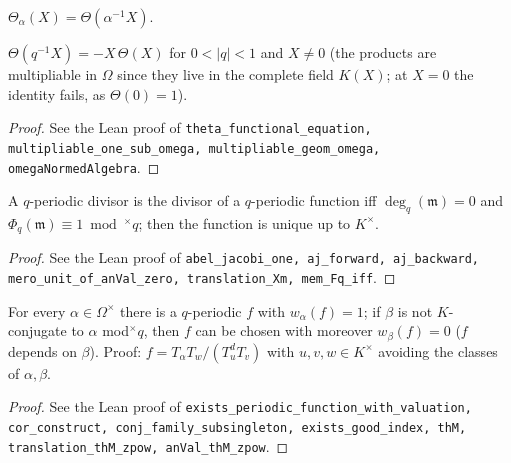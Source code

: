 \begin{definition}
\label{def:theta-alpha}
\leanok
$\Theta_\alpha(X)=\Theta(\alpha^{-1}X)$.
\end{definition}

\begin{proposition}
\label{prop:theta-functional-eq}
\leanok
$\Theta(q^{-1}X)=-X\,\Theta(X)$ for $0<|q|<1$ and $X\neq 0$ (the products are multipliable in $\Omega$ since they live in the complete field $K(X)$; at $X=0$ the identity fails, as $\Theta(0)=1$).
\end{proposition}
\begin{proof}
\leanok
See the Lean proof of \texttt{theta\_functional\_equation, multipliable\_one\_sub\_omega, multipliable\_geom\_omega, omegaNormedAlgebra}.
\end{proof}

\begin{proposition}
\label{prop:abel-jacobi-1}
\leanok
A $q$-periodic divisor is the divisor of a $q$-periodic function iff $\deg_q(\mathfrak m)=0$ and $\Phi_q(\mathfrak m)\equiv 1\bmod^\times q$; then the function is unique up to $K^\times$.
\end{proposition}
\begin{proof}
\leanok
See the Lean proof of \texttt{abel\_jacobi\_one, aj\_forward, aj\_backward, mero\_unit\_of\_anVal\_zero, translation\_Xm, mem\_Fq\_iff}.
\end{proof}

\begin{corollary}
\label{cor:periodic-with-prescribed-zero}
\leanok
For every $\alpha\in\Omega^\times$ there is a $q$-periodic $f$ with $w_\alpha(f)=1$; if $\beta$ is not $K$-conjugate to $\alpha$ mod$^\times q$, then $f$ can be chosen with moreover $w_\beta(f)=0$ ($f$ depends on $\beta$). Proof: $f=T_\alpha T_w/(T_u^{d}T_v)$ with $u,v,w\in K^\times$ avoiding the classes of $\alpha,\beta$.
\end{corollary}
\begin{proof}
\leanok
See the Lean proof of \texttt{exists\_periodic\_function\_with\_valuation, cor\_construct, conj\_family\_subsingleton, exists\_good\_index, thM, translation\_thM\_zpow, anVal\_thM\_zpow}.
\end{proof}

